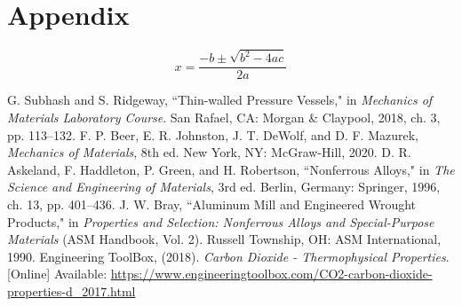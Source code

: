 \documentclass[10pt,journal,letterpaper]{IEEEtran}
\begin{document}
\lipsum[21]

\section*{Appendix}

\lipsum[22-24]
\begin{equation}
x=\frac{-b\pm\sqrt{b^2-4ac}}{2a}
\end{equation}
\lipsum[25]


\begin{thebibliography}{00}
 G. Subhash and S. Ridgeway, ``Thin-walled Pressure Vessels," in \textit{Mechanics of Materials Laboratory Course}. San Rafael, CA: Morgan \& Claypool, 2018, ch. 3, pp. 113--132.
 F. P. Beer, E. R. Johnston, J. T. DeWolf, and D. F. Mazurek, \textit{Mechanics of Materials}, 8th ed. New York, NY: McGraw-Hill, 2020.
 D. R. Askeland, F. Haddleton, P. Green, and H. Robertson, ``Nonferrous Alloys," in \textit{The Science and Engineering of Materials}, 3rd ed. Berlin, Germany: Springer, 1996, ch. 13, pp. 401--436.
 J. W. Bray, ``Aluminum Mill and Engineered Wrought Products," in \textit{Properties and Selection: Nonferrous Alloys and Special-Purpose Materials} (ASM Handbook, Vol. 2). Russell Township, OH: ASM International, 1990.
 Engineering ToolBox, (2018). \textit{Carbon Dioxide - Thermophysical Properties}. [Online] Available: \url{https://www.engineeringtoolbox.com/CO2-carbon-dioxide-properties-d_2017.html}
\end{thebibliography}
\end{document}
